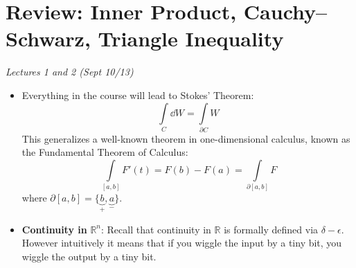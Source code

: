 \section{Review: Inner Product, Cauchy–Schwarz, Triangle Inequality}
\textit{Lectures 1 and 2 (Sept 10/13)}
\begin{itemize}
    \item Everything in the course will lead to Stokes' Theorem:
          \begin{equation}
              \int\limits_C \dd{W} = \int\limits_{\partial C}W
          \end{equation}
          This generalizes a well-known theorem in one-dimensional calculus, known as the Fundamental Theorem of Calculus:
          \begin{equation}
              \int\limits_{[a,b]} F'(t) = F(b) - F(a) = \int\limits_{\partial[a,b]}F
          \end{equation}
          where $\partial[a,b] = \{\underbrace{b}_{+},\underbrace{a}_{-}\}$.
    \item \textbf{Continuity in} $\mathbb{R}^n$: Recall that continuity in $\mathbb{R}$ is formally defined via $\delta-\epsilon.$ However intuitively it means that if you wiggle the input by a tiny bit, you wiggle the output by a tiny bit.


\end{itemize}
